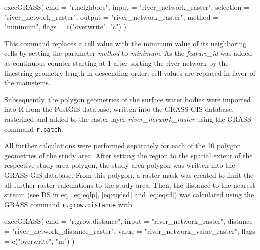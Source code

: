 \documentclass[fleqn,10pt]{wlscirep}
\newenvironment{Shaded}{\begin{snugshade}}{\end{snugshade}}
\newcommand{\AttributeTok}[1]{\textcolor[rgb]{0.77,0.63,0.00}{#1}}
\newcommand{\FunctionTok}[1]{\textcolor[rgb]{0.00,0.00,0.00}{#1}}
\newcommand{\NormalTok}[1]{#1}
\newcommand{\StringTok}[1]{\textcolor[rgb]{0.31,0.60,0.02}{#1}}
\begin{document}
\footnotesize

\begin{Shaded}
\begin{Highlighting}[]
\FunctionTok{execGRASS}\NormalTok{(}
  \AttributeTok{cmd =} \StringTok{"r.neighbors"}\NormalTok{,}
  \AttributeTok{input =} \StringTok{"river\_network\_raster"}\NormalTok{,}
  \AttributeTok{selection =} \StringTok{"river\_network\_raster"}\NormalTok{,}
  \AttributeTok{output =} \StringTok{"river\_network\_raster"}\NormalTok{,}
  \AttributeTok{method =} \StringTok{"minimum"}\NormalTok{,}
  \AttributeTok{flags =} \FunctionTok{c}\NormalTok{(}\StringTok{"overwrite"}\NormalTok{, }\StringTok{"c"}\NormalTok{)}
\NormalTok{)}
\end{Highlighting}
\end{Shaded}

\normalsize

This command replaces a cell value with the minimum value of its neighboring cells by setting the parameter \emph{method} to \emph{minimum}. As the \emph{feature\_id} was added as continuous counter starting at 1 after sorting the river network by the linestring geometry length in descending order, cell values are replaced in favor of the mainstems.

Subsequently, the polygon geometries of the surface water bodies were imported into R from the PostGIS database, written into the GRASS GIS database, rasterized and added to the raster layer \emph{river\_network\_raster} using the GRASS command \texttt{r.patch}.

All further calculations were performed separately for each of the 10 polygon geometries of the study area. After setting the region to the spatial extent of the respective study area polygon, the study area polygon was written into the GRASS GIS database. From this polygon, a raster mask was created to limit the all further raster calculations to the study area.
Then, the distance to the nearest stream (see DS in eq. \eqref{eq:eqlp}, \eqref{eq:eqdsd} and \eqref{eq:eqsd}) was calculated using the GRASS command \texttt{r.grow.distance} with

\footnotesize

\begin{Shaded}
\begin{Highlighting}[]
\FunctionTok{execGRASS}\NormalTok{(}
  \AttributeTok{cmd =} \StringTok{"r.grow.distance"}\NormalTok{,}
  \AttributeTok{input =} \StringTok{"river\_network\_raster"}\NormalTok{,}
  \AttributeTok{distance =} \StringTok{"river\_network\_distance\_raster"}\NormalTok{,}
  \AttributeTok{value =} \StringTok{"river\_network\_value\_raster"}\NormalTok{,}
  \AttributeTok{flags =} \FunctionTok{c}\NormalTok{(}\StringTok{"overwrite"}\NormalTok{, }\StringTok{"m"}\NormalTok{)}
\NormalTok{)}
\end{Highlighting}
\end{Shaded}
\end{document}
